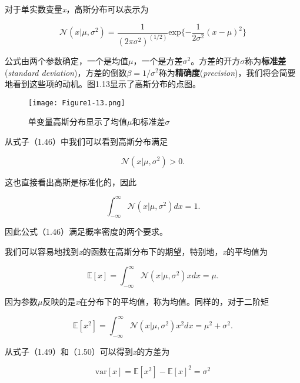 	 对于单实数变量\textit{x}，高斯分布可以表示为
	 
	 \begin{equation}
	 \mathcal{N}(x | \mu, \sigma^2) = \frac{1}{(2 \pi \sigma^2)^(1/2)} \mathrm{exp}\{- \frac{1}{2 \sigma^2}(x - \mu)^2\}
	 \end{equation}

	公式由两个参数确定，一个是均值$\mu$，一个是方差$\sigma^2$。方差的开方$\sigma$称为\textbf{标准差}(\textit{standard deviation})，方差的倒数$\beta = 1/\sigma^2$称为\textbf{精确度}(\textit{precision})，我们将会简要地看到这些项的动机。图1.13显示了高斯分布的点图。
	
	\begin{figure}[b]
		\parbox{.4\textwidth}{\caption{ 单变量高斯分布显示了均值$\mu$和标准差$\sigma$ }}
		\parbox{.5\textwidth}{\texttt{[image: Figure1-13.png]}}
	\end{figure}
	
	从式子（1.46）中我们可以看到高斯分布满足
	
	\begin{equation}
	\mathcal{N}(x | \mu, \sigma^2) > 0.
	\end{equation}
	
	这也直接看出高斯是标准化的，因此
	
	\begin{equation}
	\int_{- \infty}^{\infty} \mathcal{N}(x | \mu, \sigma^2) dx = 1.
	\end{equation}
	
	因此公式（1.46）满足概率密度的两个要求。
	
	我们可以容易地找到\textit{x}的函数在高斯分布下的期望，特别地，\textit{x}的平均值为
	
	\begin{equation}
	\mathbb{E}[x] = \int_{- \infty}^{\infty} \mathcal{N}(x | \mu, \sigma^2) x dx = \mu.
	\end{equation}
	
	因为参数$\mu$反映的是\textit{x}在分布下的平均值，称为均值。同样的，对于二阶矩
	
	\begin{equation}
	\mathbb{E}[x^2] = \int_{- \infty}^{\infty} \mathcal{N}(x | \mu, \sigma^2) x^2 dx = \mu^2 + \sigma^2.
	\end{equation}
	
	从式子（1.49）和（1.50）可以得到\textit{x}的方差为
	
	\begin{equation}
	\mathrm{var}[x] = \mathbb{E}[x^2] - \mathbb{E}[x]^2 = \sigma^2
	\end{equation}
	
